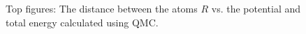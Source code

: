 \begin{frame}
 \captionsetup[subfloat]{labelformat=empty}
 \begin{figure}
 \begin{center}
  \caption{Top figures: The distance between the atoms $R$ vs. the potential and total energy calculated using QMC.}
  \label{fig:molecules_R_vs_E}
 \end{center}
\end{figure}
\end{frame}


